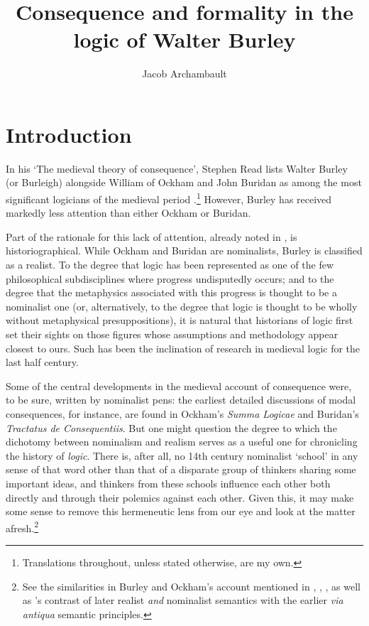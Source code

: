 \documentclass[]{article}
\title{Consequence and formality in the logic of Walter Burley}
\author{Jacob Archambault}
\begin{document}
\maketitle

\begin{abstract}

\end{abstract}

\section{Introduction}
In his `The medieval theory of consequence', Stephen Read lists Walter Burley (or Burleigh) alongside William of Ockham and John Buridan as among the most significant logicians of the medieval period \cite[p. 900]{Read2012}.\footnote{Translations throughout, unless stated otherwise, are my own.} However, Burley has received markedly less attention than either Ockham or Buridan. 

Part of the rationale for this lack of attention, already noted in \cite[p. VI]{Boehner1955}, is historiographical. While Ockham and Buridan are nominalists, Burley is classified as a realist. To the degree that logic has been represented as one of the few philosophical subdisciplines where progress undisputedly occurs; and to the degree that the metaphysics associated with this progress is thought to be a nominalist one (or, alternatively, to the degree that logic is thought to be wholly without metaphysical presuppositions), it is natural that historians of logic first set their sights on those figures whose assumptions and methodology appear closest to ours. Such has been the inclination of research in medieval logic for the last half century.

Some of the central developments in the medieval account of consequence were, to be sure, written by nominalist pens: the earliest detailed discussions of modal consequences, for instance, are found in Ockham's \textit{Summa Logicae} and Buridan's \textit{Tractatus de Consequentiis}. But one might question the degree to which the dichotomy between nominalism and realism serves as a useful one for chronicling the history of \textit{logic}. There is, after all, no 14th century nominalist `school' in any sense of that word other than that of a disparate group of thinkers sharing some important ideas, and thinkers from these schools influence each other both directly and through their polemics against each other. Given this, it may make some sense to remove this hermeneutic lens from our eye and look at the matter afresh.\footnote{See the similarities in Burley and Ockham's account mentioned in \cite[p. 46-47]{Normore1999}, \cite[p. 100]{Spade1999a}, \cite[pp. 379-380]{DutilhNovaes2008b}, as well as \cite{Klima1991}'s contrast of later realist \textit{and} nominalist semantics with the earlier \textit{via antiqua} semantic principles.} 
\end{document}
